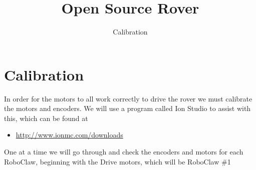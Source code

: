 \documentclass[12pt]{article}
\begin{document}
\title{Open Source Rover}
\author{Calibration}

\makeatletter         
\def\@maketitle{
\begin{center}	
	\makebox[\textwidth][c]{ \texttt{[image: "Pictures/calibration".png]}}
	{\Huge \bfseries \sffamily \@title }\\[4ex] 
	{\huge \bfseries \sffamily \@author}\\[4ex] 
	\texttt{[image: "Pictures/JPL logo".png]}
\end{center}}
\makeatother

\maketitle

\newpage


\tableofcontents




\section{Calibration}
\label{cal section}
In order for the motors to all work correctly to drive the rover we must calibrate the motors and encoders. We will use a program called Ion Studio to assist with this, which can be found at 
\begin{itemize}
	\item \href{http://www.ionmc.com/downloads}{http://www.ionmc.com/downloads} 
\end{itemize}

\noindent One at a time we will go through and check the encoders and motors for each RoboClaw, beginning with the Drive motors, which will be RoboClaw \#1
\end{document}
